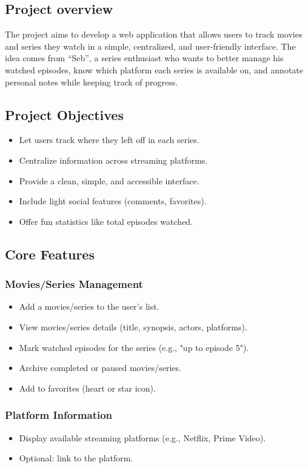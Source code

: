 \subsection{Project overview}
The project aims to develop a web application that allows users to track movies and series they watch in a simple, centralized, and user-friendly interface. The idea comes from “Seb”, a series enthusiast who wants to better manage his watched episodes, know which platform each series is available on, and annotate personal notes while keeping track of progress.

\subsection{Project Objectives}
\begin{itemize}
    \item Let users track where they left off in each series.
    \item Centralize information across streaming platforms.
    \item Provide a clean, simple, and accessible interface.
    \item Include light social features (comments, favorites).
    \item Offer fun statistics like total episodes watched.
\end{itemize}

\subsection{Core Features}

\subsubsection{Movies/Series Management}
\begin{itemize}
    \item Add a movies/series to the user's list.
    \item View movies/series details (title, synopsis, actors, platforms).
    \item Mark watched episodes for the series (e.g., "up to episode 5").
    \item Archive completed or paused movies/series.
    \item Add to favorites (heart or star icon).
\end{itemize}

\subsubsection{Platform Information}
\begin{itemize}
    \item Display available streaming platforms (e.g., Netflix, Prime Video).
    \item Optional: link to the platform.
\end{itemize}


